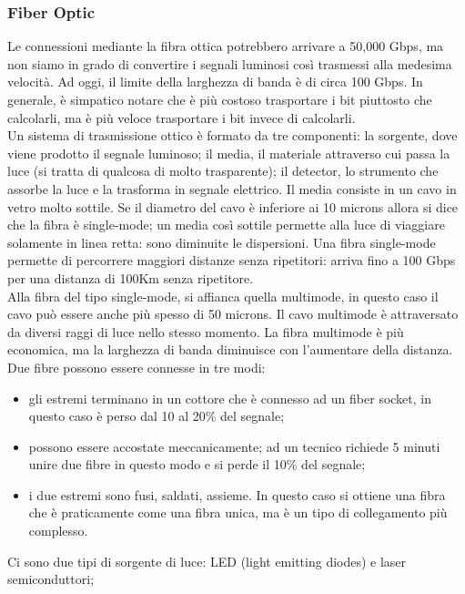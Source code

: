 \documentclass{article}
\begin{document}
\subsubsection{Fiber Optic}
Le connessioni mediante la fibra ottica potrebbero arrivare a 50,000 Gbps, ma
non siamo in grado di convertire i segnali luminosi così trasmessi alla medesima
velocità. Ad oggi, il limite della larghezza di banda è di circa 100 Gbps. In
generale, è simpatico notare che è più costoso trasportare i bit piuttosto che
calcolarli, ma è più veloce trasportare i bit invece di calcolarli.\\
Un sistema di trasmissione ottico è formato da tre componenti: la sorgente, dove
viene prodotto il segnale luminoso; il media, il materiale attraverso cui passa
la luce (si tratta di qualcosa di molto trasparente); il detector, lo strumento
che assorbe la luce e la trasforma in segnale elettrico. Il media consiste in un
cavo in vetro molto sottile. Se il diametro del cavo è inferiore ai 10 microns
allora si dice che la fibra è single-mode; un media così sottile permette alla
luce di viaggiare solamente in linea retta: sono diminuite le dispersioni. 
Una fibra single-mode permette di percorrere maggiori distanze senza ripetitori: 
arriva fino a 100 Gbps per una distanza di 100Km senza ripetitore.\\
Alla fibra del tipo single-mode, si affianca quella multimode, in questo caso il
cavo può essere anche più spesso di 50 microns. Il cavo multimode è
attraversato da diversi raggi di luce nello stesso momento. La fibra multimode è
più economica, ma la larghezza di banda diminuisce con l'aumentare della
distanza.\\

Due fibre possono essere connesse in tre modi: 
\begin{itemize}
	\item gli estremi terminano in un cottore che è connesso ad un fiber socket,
		in questo caso è perso dal 10 al 20\% del segnale;
	\item possono essere accostate meccanicamente; ad un tecnico richiede 5
		minuti unire due fibre in questo modo e si perde il 10\% del segnale;
	\item i due estremi sono fusi, saldati, assieme. In questo caso si ottiene
		una fibra che è praticamente come una fibra unica, ma è un tipo di
		collegamento più complesso. 
\end{itemize}

Ci sono due tipi di sorgente di luce: LED (light emitting diodes) e laser
semiconduttori;
\end{document}
